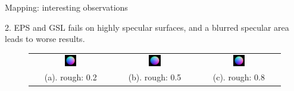 \documentclass[10pt]{beamer}
\begin{document}
\begin{frame}{Mapping: interesting observations}
\begin{exampleblock}{2. EPS and GSL fails on highly specular surfaces, and a blurred specular area leads to worse results.}
\begin{figure}
\begin{tabular}{ccc}
\includegraphics[width=0.15\textwidth]{mapping/ps_spec_rough/0802_normal}&
\includegraphics[width=0.15\textwidth]{mapping/ps_spec_rough/0805_normal}&
\includegraphics[width=0.15\textwidth]{mapping/ps_spec_rough/0808_normal}\\
(a). rough: 0.2 & (b). rough: 0.5 & (c). rough: 0.8
\end{tabular}
\end{figure}
\end{exampleblock}

\end{frame}


\end{document}
